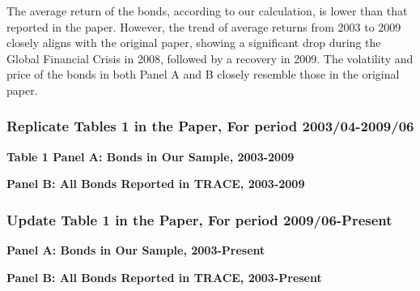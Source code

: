 \documentclass{article}
\newcommand*{\PathToOutput}{../output/}%
\begin{document}
The average return of the bonds, according to our calculation, is lower than that reported in the paper. However, the trend of average returns from 2003 to 2009 closely aligns with the original paper, showing a significant drop during the Global Financial Crisis in 2008, followed by a recovery in 2009. The volatility and price of the bonds in both Panel A and B closely resemble those in the original paper.

\subsubsection{Replicate Tables 1 in the Paper, For period 2003/04-2009/06}

\begin{table}[hbt!]
\centering
\textbf{\small Table 1 Panel A: Bonds in Our Sample, 2003-2009}
\small %
\renewcommand{\arraystretch}{0.9} %

\label{table:table1_panelA}
\end{table}
\FloatBarrier %

\begin{table}[hbt!]
\centering
\textbf{\small Panel B: All Bonds Reported in TRACE, 2003-2009}
\small %
\renewcommand{\arraystretch}{0.92} %

\label{table:table1_panelB}
\end{table}
\FloatBarrier %

\subsubsection{Update Table 1 in the Paper, For period 2009/06-Present}

\begin{table}[hbt!]
\centering
\textbf{\small Panel A: Bonds in Our Sample, 2003-Present}
\resizebox{\textwidth}{!}{%
    
}
\label{table:  table1_panelA_uptodate}
\end{table}
\FloatBarrier %

\begin{table}[hbt!]
\centering
\textbf{\small Panel B: All Bonds Reported in TRACE, 2003-Present}
\resizebox{\textwidth}{!}{%
    
}
\label{table:  table1_panelB_uptodate}
\end{table}
\FloatBarrier %
\end{document}
